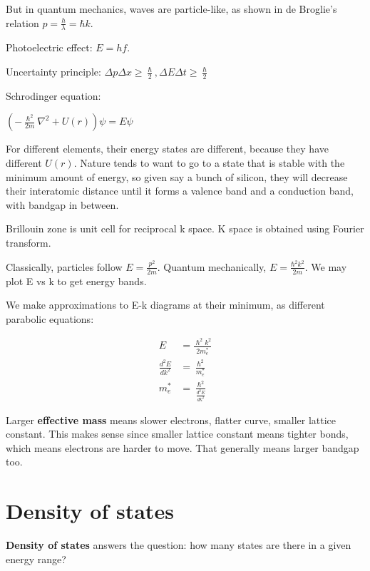 \documentclass[a4paper,10pt]{article}
\begin{document}
\begin{multicols}{3}
But in quantum mechanics, waves are particle-like, as shown in de Broglie's relation $p = \frac{h}{\lambda} = \hbar k$.

Photoelectric effect: $E = hf$.

Uncertainty principle: $\Delta p \Delta x \ge \frac{\hslash}{2}, \Delta E \Delta t \ge \frac{\hslash}{2}$

Schrodinger equation: 

$\left(- \frac{\hslash^{2}}{2m}\nabla^{2}+U(r)\right)\psi = E\psi$

For different elements, their energy states are different, because they have different $U(r)$. Nature tends to want to go to a state that is stable with the minimum amount of energy, so given say a bunch of silicon, they will decrease their interatomic distance until it forms a valence band and a conduction band, with bandgap in between.

Brillouin zone is unit cell for reciprocal k space. K space is obtained using Fourier transform.

Classically, particles follow $E = \frac{p^2}{2m}$. Quantum mechanically, $E = \frac{\hbar^2 k^2}{2m}$. We may plot E vs k to get energy bands.

We make approximations to E-k diagrams at their minimum, as different parabolic equations:

\begin{align*}
    E &= \frac{\hslash^{2}k^{2}}{2m_{e}^{*}} \\
    \frac{d^{2}E}{dk^{2}} &= \frac{\hslash^{2}}{m_{e}^{*}} \\
    m_{e}^{*} &= \frac{\hslash^{2}}{\frac{d^{2}E}{dk^{2}}}
\end{align*}

Larger \textbf{effective mass} means slower electrons, flatter curve, smaller lattice constant. This makes sense since smaller lattice constant means tighter bonds, which means electrons are harder to move. That generally means larger bandgap too.

\section*{Density of states}

\textbf{Density of states} answers the question: how many states are there in a given energy range?


\end{multicols}
\end{document}
